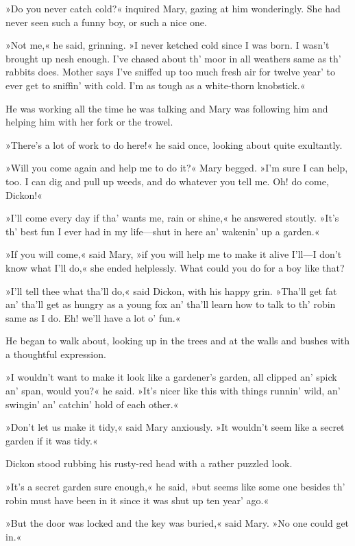 »Do you never catch cold?« inquired Mary, gazing at him wonderingly. She had never seen such a funny boy, or such a nice one.

»Not me,« he said, grinning. »I never ketched cold since I was born. I wasn't brought up nesh enough. I've chased about th' moor in all weathers same as th' rabbits does. Mother says I've sniffed up too much fresh air for twelve year' to ever get to sniffin' with cold. I'm as tough as a white-thorn knobstick.«

He was working all the time he was talking and Mary was following him and helping him with her fork or the trowel.

»There's a lot of work to do here!« he said once, looking about quite exultantly.

»Will you come again and help me to do it?« Mary begged. »I'm sure I can help, too. I can dig and pull up weeds, and do whatever you tell me. Oh! do come, Dickon!«

»I'll come every day if tha' wants me, rain or shine,« he answered stoutly. »It's th' best fun I ever had in my life—shut in here an' wakenin' up a garden.«

»If you will come,« said Mary, »if you will help me to make it alive I'll—I don't know what I'll do,« she ended helplessly. What could you do for a boy like that?

»I'll tell thee what tha'll do,« said Dickon, with his happy grin. »Tha'll get fat an' tha'll get as hungry as a young fox an' tha'll learn how to talk to th' robin same as I do. Eh! we'll have a lot o' fun.«

He began to walk about, looking up in the trees and at the walls and bushes with a thoughtful expression.

»I wouldn't want to make it look like a gardener's garden, all clipped an' spick an' span, would you?« he said. »It's nicer like this with things runnin' wild, an' swingin' an' catchin' hold of each other.«

»Don't let us make it tidy,« said Mary anxiously. »It wouldn't seem like a secret garden if it was tidy.«

Dickon stood rubbing his rusty-red head with a rather puzzled look.

»It's a secret garden sure enough,« he said, »but seems like some one besides th' robin must have been in it since it was shut up ten year' ago.«

»But the door was locked and the key was buried,« said Mary. »No one could get in.«

